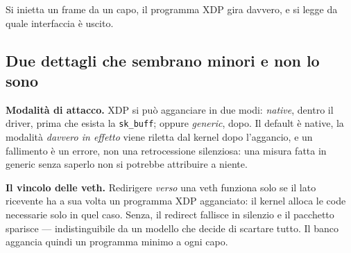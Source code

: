 \documentclass[11pt,a4paper,oneside]{report}
\begin{document}
\begin{center}
\end{center}

Si inietta un frame da un capo, il programma XDP gira davvero, e si legge da
quale interfaccia è uscito.

\subsection*{Due dettagli che sembrano minori e non lo sono}

\textbf{Modalità di attacco.} XDP si può agganciare in due modi: \emph{native},
dentro il driver, prima che esista la \texttt{sk\_buff}; oppure \emph{generic},
dopo. Il default è native, la modalità \emph{davvero in effetto} viene
riletta dal kernel dopo l'aggancio, e un fallimento è un errore, non una
retrocessione silenziosa: una misura fatta in generic senza saperlo non si
potrebbe attribuire a niente.

\textbf{Il vincolo delle veth.} Redirigere \emph{verso} una veth funziona solo
se il lato ricevente ha a sua volta un programma XDP agganciato: il kernel
alloca le code necessarie solo in quel caso. Senza, il redirect fallisce in
silenzio e il pacchetto sparisce --- indistinguibile da un modello che decide di
scartare tutto. Il banco aggancia quindi un programma minimo a ogni capo.
\end{document}
